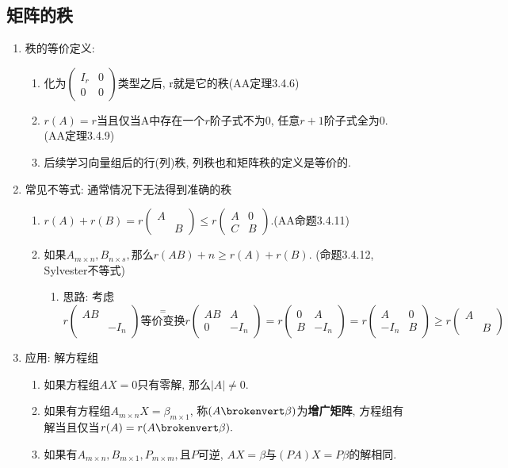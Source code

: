 \subsection*{矩阵的秩}
\begin{enumerate}
\item 秩的等价定义:
\begin{enumerate}
\item 化为$\begin{pmatrix}I_{r} & 0\\
0 & 0
\end{pmatrix}$类型之后, r就是它的秩(AA定理3.4.6)
\item $r(A)=r$当且仅当A中存在一个$r$阶子式不为$0$, 任意$r+1$阶子式全为$0$.(AA定理3.4.9)
\item 后续学习向量组后的行(列)秩, 列秩也和矩阵秩的定义是等价的. 
\end{enumerate}
\item 常见不等式: 通常情况下无法得到准确的秩
\begin{enumerate}
\item $r(A)+r(B)=r\begin{pmatrix}A\\
 & B
\end{pmatrix}\leq r\begin{pmatrix}A & 0\\
C & B
\end{pmatrix}.$(AA命题3.4.11)
\item 如果$A_{m\times n},B_{n\times s},$那么$r(AB)+n\geq r(A)+r(B)$. (命题3.4.12,
Sylvester不等式)
\begin{enumerate}
\item 思路: 考虑$r\begin{pmatrix}AB\\
 & -I_{n}
\end{pmatrix}\overset{=}{\text{等价变换}}r\begin{pmatrix}AB & A\\
0 & -I_{n}
\end{pmatrix}=r\begin{pmatrix}0 & A\\
B & -I_{n}
\end{pmatrix}=r\begin{pmatrix}A & 0\\
-I_{n} & B
\end{pmatrix}\geq r\begin{pmatrix}A\\
 & B
\end{pmatrix}$
\end{enumerate}
\end{enumerate}
\item 应用: 解方程组
\begin{enumerate}
\item 如果方程组$AX=0$只有零解, 那么$|A|\neq0$.
\item 如果有方程组$A_{m\times n}X=\beta_{m\times1}$, 称$(A\brokenvert\beta)$为\textbf{增广矩阵},
方程组有解当且仅当$r(A)=r(A\brokenvert\beta).$
\item 如果有$A_{m\times n},B_{m\times1},P_{m\times m},$且$P$可逆, $AX=\beta$与$(PA)X=P\beta$的解相同.
\end{enumerate}
\end{enumerate}


